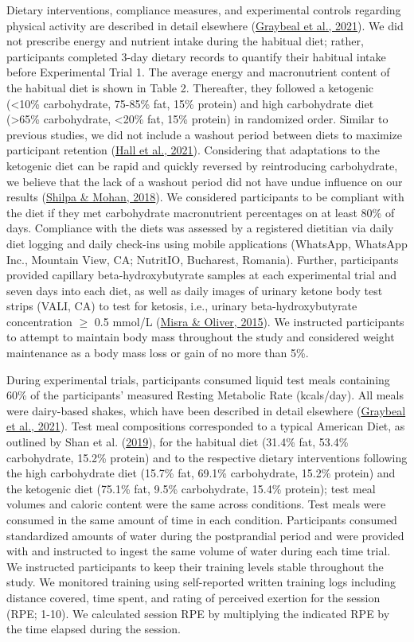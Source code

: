 \documentclass[]{cik}%
\begin{document}
Dietary interventions, compliance measures, and experimental controls
regarding physical activity are described in detail elsewhere
(\protect\hyperlink{ref-37}{Graybeal et al., 2021}). We did not
prescribe energy and nutrient intake during the habitual diet; rather,
participants completed 3-day dietary records to quantify their habitual
intake before Experimental Trial 1. The average energy and macronutrient
content of the habitual diet is shown in Table 2. Thereafter, they
followed a ketogenic (\textless10\% carbohydrate, 75-85\% fat, 15\%
protein) and high carbohydrate diet (\textgreater65\% carbohydrate,
\textless20\% fat, 15\% protein) in randomized order. Similar to
previous studies, we did not include a washout period between diets to
maximize participant retention (\protect\hyperlink{ref-39}{Hall et al.,
2021}). Considering that adaptations to the ketogenic diet can be rapid
and quickly reversed by reintroducing carbohydrate, we believe that the
lack of a washout period did not have undue influence on our results
(\protect\hyperlink{ref-40}{Shilpa \& Mohan, 2018}). We considered
participants to be compliant with the diet if they met carbohydrate
macronutrient percentages on at least 80\% of days. Compliance with the
diets was assessed by a registered dietitian via daily diet logging and
daily check-ins using mobile applications (WhatsApp, WhatsApp Inc.,
Mountain View, CA; NutritIO, Bucharest, Romania). Further, participants
provided capillary beta-hydroxybutyrate samples at each experimental
trial and seven days into each diet, as well as daily images of urinary
ketone body test strips (VALI, CA) to test for ketosis, i.e., urinary
beta-hydroxybutyrate concentration \(\ge\) 0.5 mmol/L
(\protect\hyperlink{ref-41}{Misra \& Oliver, 2015}). We instructed
participants to attempt to maintain body mass throughout the study and
considered weight maintenance as a body mass loss or gain of no more
than 5\%.

During experimental trials, participants consumed liquid test meals
containing 60\% of the participants' measured Resting Metabolic Rate
(kcals/day). All meals were dairy-based shakes, which have been
described in detail elsewhere (\protect\hyperlink{ref-37}{Graybeal et
al., 2021}). Test meal compositions corresponded to a typical American
Diet, as outlined by Shan et al. (\protect\hyperlink{ref-32}{2019}), for
the habitual diet (31.4\% fat, 53.4\% carbohydrate, 15.2\% protein) and
to the respective dietary interventions following the high carbohydrate
diet (15.7\% fat, 69.1\% carbohydrate, 15.2\% protein) and the ketogenic
diet (75.1\% fat, 9.5\% carbohydrate, 15.4\% protein); test meal volumes
and caloric content were the same across conditions. Test meals were
consumed in the same amount of time in each condition. Participants
consumed standardized amounts of water during the postprandial period
and were provided with and instructed to ingest the same volume of water
during each time trial. We instructed participants to keep their
training levels stable throughout the study. We monitored training using
self-reported written training logs including distance covered, time
spent, and rating of perceived exertion for the session (RPE; 1-10). We
calculated session RPE by multiplying the indicated RPE by the time
elapsed during the session.
\end{document}
